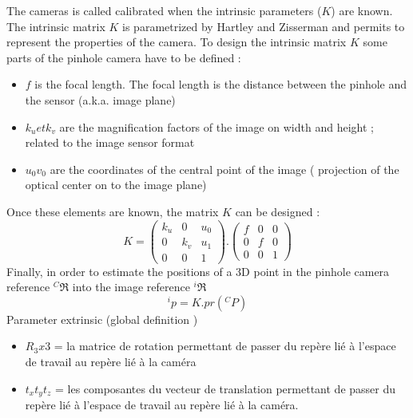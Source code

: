 The cameras is called calibrated when the intrinsic parameters ($K$) are known.  
 The intrinsic matrix $K$ is parametrized by Hartley and Zisserman and permits to represent the properties of the camera. To design the intrinsic matrix $K$ some parts of the pinhole camera have to be defined :\\
  \begin{itemize}
  
 	\item $f$ is  the focal length. The focal length is the distance between the pinhole and the sensor (a.k.a. image plane)
  	\item $k_u et k_v$ are the magnification factors of the image on width and height ; related to the image sensor format%
  	\item $u_0 v_0$  are the coordinates  of  the central point of the image ( projection of the optical center on to the image plane)  %
  	  \end{itemize}
		Once these elements are known, the matrix $K$ can be designed :
	\begin{equation}
		K=
		\begin{pmatrix}
			k_u 	& 0 	& u_0 \\
			0 		& k_v	& u_1\\
			0 		&	0	& 1
		\end{pmatrix} .
		\begin{pmatrix}
			f 		& 0 	& 0  \\
			0 		& f		& 0  \\
			0 		&	0	& 1  
		\end{pmatrix} 
	\label{eq:K}
	\end{equation}
Finally, in order to estimate the positions of a 3D point in the pinhole camera reference $^C\Re$ into the image reference $^i\Re$ 
$$
^ip=K.pr(^CP)
$$ 	  
 Parameter extrinsic (global definition ) \\
  \begin{itemize}
 	\item$R_3x3$ = la matrice de rotation permettant de passer du repère lié à l'espace de travail au repère lié à la caméra\\
 	\item$t_x t_y t_z$ = les composantes du vecteur de translation permettant de passer du repère lié à l'espace de travail au repère lié à la caméra.\\
  \end{itemize}
 
